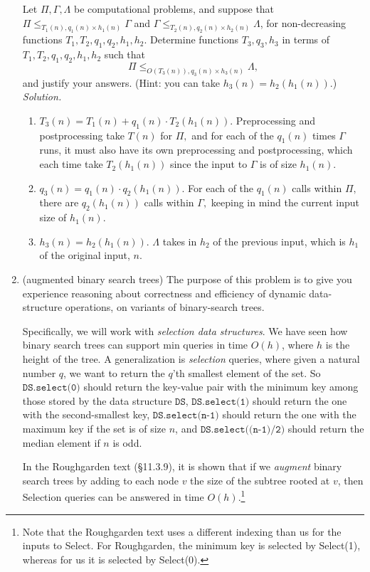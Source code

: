 \documentclass[11pt]{article}
\begin{document}
\begin{enumerate}
    Let $\Pi, \Gamma, \Lambda$ be computational problems, and suppose that $\Pi\leq_{T_1(n),q_1(n)\times h_1(n)} \Gamma$ and $\Gamma \leq_{T_2(n),q_2(n)\times h_2(n)} \Lambda$, for non-decreasing functions $T_1,T_2,q_1,q_2,h_1,h_2$.  Determine functions $T_3,q_3,h_3$ in terms of $T_1,T_2,q_1,q_2,h_1,h_2$ such that 
    $$\Pi \leq_{O(T_3(n)),q_3(n)\times h_3(n)} \Lambda,$$
    and justify your answers. 
    (Hint: you can take $h_3(n)=h_2(h_1(n))$.) \\
    \textit{Solution.} 
    \begin{enumerate}
        \item $T_3(n) = T_1(n) + q_1(n)\cdot T_2(h_1(n)).$ Preprocessing and postprocessing take $T(n)$ for $\Pi,$ and for each of the $q_1(n)$ times $\Gamma$ runs, it must also have its own preprocessing and postprocessing, which each time take $T_2(h_1(n))$ since the input to $\Gamma$ is of size $h_1(n).$
        \item $q_3(n) = q_1(n)\cdot q_2(h_1(n)).$ For each of the $q_1(n)$ calls within $\Pi,$ there are $q_2(h_1(n))$ calls within $\Gamma,$ keeping in mind the current input size of $h_1(n).$
        \item $h_3(n) = h_2(h_1(n)).$ $\Lambda$ takes in $h_2$ of the previous input, which is $h_1$ of the original input, $n.$
    \end{enumerate}

    
    \item (augmented binary search trees) The purpose of this problem is to give you experience reasoning about correctness and efficiency of dynamic data-structure operations, on variants of binary-search trees. 
    
    Specifically, we will work with {\em selection data structures}.
    We have seen how binary search trees can support min queries in time $O(h)$, where $h$ is the height of the tree.  A generalization is {\em selection} queries, where given a natural number $q$, we want to return the $q$'th smallest element of the set.  So $\texttt{DS.select(0)}$ should return the key-value pair with the minimum key among those stored by the data structure $\texttt{DS}$, $\texttt{DS.select(1)}$ should return the one with the second-smallest key, $\texttt{DS.select(n-1)}$ should return the one with the maximum key if the set is of size $n$, and $\texttt{DS.select((n-1)/2)}$ should return the median element if $n$ is odd.
    
    In the Roughgarden text (\S11.3.9), it is shown that if we {\em augment} binary search trees by adding to each node $v$ the size of the subtree rooted at $v$, then Selection queries can be answered in time $O(h)$.\footnote{Note that the Roughgarden text uses a different indexing than us for the inputs to Select. For Roughgarden, the minimum key is selected by Select(1), whereas for us it is selected by Select(0).}
    

\end{enumerate}
\end{document}
